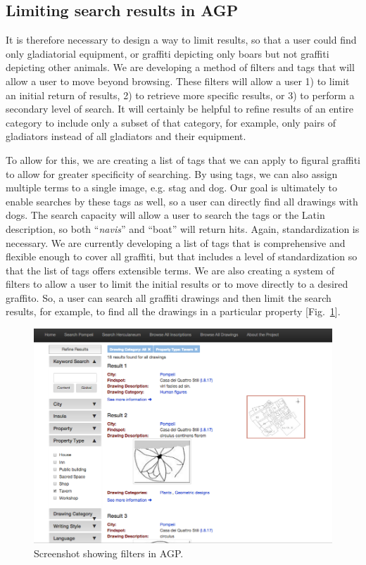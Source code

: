 \documentclass[amsthm,ebook]{saparticle}
\begin{document}
\subsection{Limiting search results in AGP}


\noindent It is therefore necessary to design a way to limit results, so that a user could find only gladiatorial equipment,
or graffiti depicting only boars but not graffiti depicting other animals. We are developing a method of filters and
tags that will allow a user to move beyond browsing. These filters will allow a user 1) to limit an initial return of
results, 2) to retrieve more specific results, or 3) to perform a secondary level of search. It will certainly be
helpful to refine results of an entire category to include only a subset of that category, for example, only pairs of
gladiators instead of all gladiators and their equipment.

To allow for this, we are creating a list of tags that we can apply to figural graffiti to allow for greater specificity
of searching. By using tags, we can also assign multiple terms to a single image, e.g. stag and dog. Our goal is
ultimately to enable searches by these tags as well, so a user can directly find all drawings with dogs. The search
capacity will allow a user to search the tags or the Latin description, so both ``\emph{navis}'' and ``boat'' will return hits.
Again, standardization is necessary. We are currently developing a list of tags that is comprehensive and flexible
enough to cover all graffiti, but that includes a level of standardization so that the list of tags offers extensible
terms. We are also creating a system of filters to allow a user to limit the initial results or to move directly to a
desired graffito. So, a user can search all graffiti drawings and then limit the search results, for example, to find
all the drawings in a particular property [Fig.~\ref{fig:9}].


\begin{figure}[!hbp]
\centering
 \includegraphics[width=0.9\columnwidth]{EAGLE2016BenefielSypniewski-img009.png}
\caption{Screenshot showing filters in AGP.}
\label{fig:9}
\end{figure}
\end{document}
